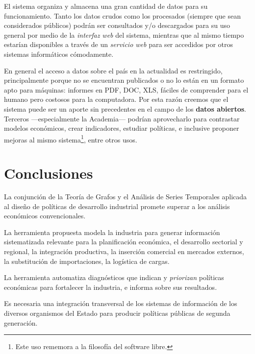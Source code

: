 \documentclass[a4paper]{report}
\begin{document}
El sistema organiza y almacena una gran cantidad de datos para su funcionamiento. Tanto los datos crudos como los procesados (siempre que sean considerados públicos) podrán ser consultados y/o descargados para su uso general por medio de la \textit{interfaz web} del sistema, mientras que al mismo tiempo estarían disponibles a través de un \textit{servicio web} para ser accedidos por otros sistemas informáticos cómodamente.

En general el acceso a datos sobre el país en la actualidad es restringido, principalmente porque no se encuentran publicados o no lo están en un formato apto para máquinas: informes en \textsc{PDF}, \textsc{DOC}, \textsc{XLS}, fáciles de comprender para el humano pero costosos para la computadora. Por esta razón creemos que el sistema puede ser un aporte sin precedentes en el campo de los \textbf{datos abiertos}. Terceros —especialmente la Academia— podrían aprovecharlo para contrastar modelos económicos, crear indicadores, estudiar políticas, e inclusive proponer mejoras al mismo sistema\footnote{Este uso rememora a la filosofía del software libre.}, entre otros usos.

\section*{Conclusiones}


La conjunción de la Teoría de Grafos y el Análisis de Series Temporales aplicada al diseño de políticas de desarrollo industrial promete superar a los análisis económicos convencionales.

La herramienta propuesta modela la industria para generar información sistematizada relevante para la planificación económica, el desarrollo sectorial y regional, la integración productiva, la inserción comercial en mercados externos, la substitución de importaciones, la logística de cargas.

La herramienta automatiza diagnósticos que indican y \textit{priorizan} políticas económicas para fortalecer la industria, e informa sobre sus resultados.

Es necesaria una integración transversal de los sistemas de información de los diversos organismos del Estado para producir políticas públicas de segunda generación.
\end{document}
